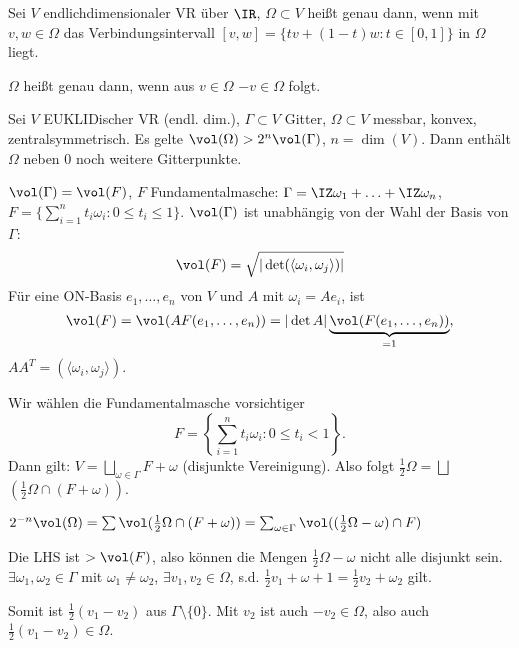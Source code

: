 \renewcommand{\lecdate}{19.11.2014}

\begin{Definition}
 Sei $V$ endlichdimensionaler VR über $\IR$, $\Omega\subset V$ heißt  genau dann, wenn mit $v,w\in\Omega$ das Verbindungsintervall $[v,w]=\{tv+(1-t)w : t\in[0,1] \}$ in $\Omega$ liegt.
 
 $\Omega$ heißt  genau dann, wenn aus $v\in \Omega$ $-v\in\Omega$ folgt.
\end{Definition}

\begin{Fakt}
 Sei $V$ EUKLIDischer VR (endl. dim.), $\Gamma\subset V$ Gitter, $\Omega\subset V$ messbar, konvex, zentralsymmetrisch.
Es gelte $\vol(\Omega)>2^n\vol(\Gamma)$, $n=\dim(V)$. Dann enthält $\Omega$ neben $0$ noch weitere Gitterpunkte.
\end{Fakt}


\begin{Bemerkung}
 $\vol(\Gamma)=\vol(F)$, $F$ Fundamentalmasche: $\Gamma=\IZ\omega_1+\ldots+\IZ\omega_n$, $F=\{\sum_{i=1}^n t_i\omega_i: 0\leq t_i\leq 1 \}$. $\vol(\Gamma)$ ist unabhängig von der Wahl der Basis von $\Gamma$:
 \[\vol(F)=\sqrt{|\det(\langle\omega_i,\omega_j \rangle)|} \]
 Für eine ON-Basis $e_1,\ldots,e_n$ von $V$ und $A$ mit $\omega_i=Ae_i$, ist  
 \[\vol(F)=\vol(A F(e_1,\ldots,e_n))=|\det A| \underbrace{\vol(F(e_1,\ldots,e_n))}_{=1},\] $AA^T=(\langle\omega_i,\omega_j\rangle)$.
\end{Bemerkung}

\begin{Beweis}
 Wir wählen die Fundamentalmasche vorsichtiger
 \[ F=\left\{\sum_{i=1}^nt_i\omega_i : 0\leq t_i<1 \right\}.\]
 Dann gilt: $V= \bigsqcup_{\omega\in\Gamma} F+\omega$ (disjunkte Vereinigung).
 Also folgt $\frac{1}{2}\Omega=\bigsqcup$ $(\frac{1}{2}\Omega\cap (F+\omega))$.
 
 \folge $2^{-n}\vol(\Omega)=\sum \vol(\frac{1}{2}\Omega\cap(F+\omega))=\sum_{\omega\in\Gamma} \vol((\frac{1}{2}\Omega-\omega)\cap F)$
 
Die LHS ist $>\vol(F)$, also können die Mengen $\frac{1}{2}\Omega-\omega$ nicht alle disjunkt sein. $\exists \omega_1,\omega_2\in\Gamma$ mit $\omega_1\neq\omega_2$, $\exists v_1,v_2\in\Omega$, s.d. $\frac{1}{2}v_1+\omega+1=\frac{1}{2}v_2+\omega_2$ gilt.

Somit ist $\frac{1}{2}(v_1-v_2)$ aus $\Gamma\setminus\{0\}$. Mit $v_2$ ist auch $-v_2\in\Omega$, also auch $\frac{1}{2}(v_1-v_2)\in \Omega$.
\end{Beweis}

